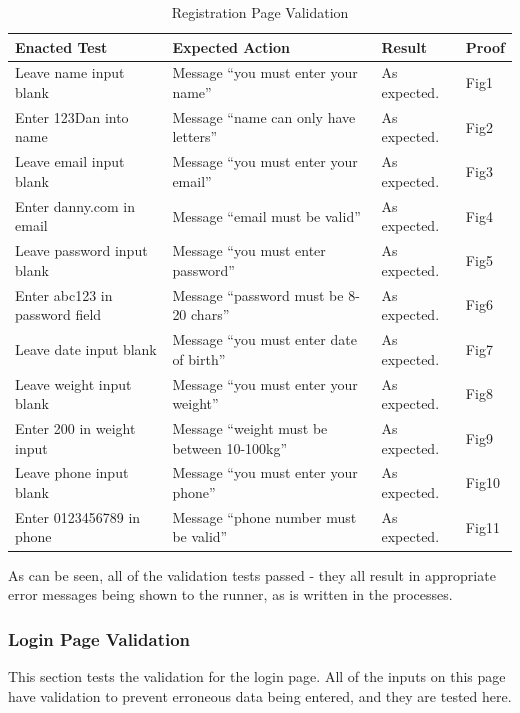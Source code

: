 \documentclass{article}[12pt,a4paper]
\begin{document}
\begin{table}[h]
\begin{tabular}{|l|l|l|l|}
\hline
\textbf{Enacted Test}          & \textbf{Expected Action}                  & \textbf{Result} & \textbf{Proof} \\ \hline
Leave name input blank         & Message ``you must enter your name''        & As expected.    & Fig1           \\ \hline
Enter 123Dan into name         & Message ``name can only have letters''      & As expected.    & Fig2           \\ \hline
Leave email input blank        & Message ``you must enter your email''       & As expected.    & Fig3           \\ \hline
Enter danny.com in email       & Message ``email must be valid''             & As expected.    & Fig4           \\ \hline
Leave password input blank     & Message ``you must enter password''         & As expected.    & Fig5           \\ \hline
Enter abc123 in password field & Message ``password must be 8-20 chars''     & As expected.    & Fig6           \\ \hline
Leave date input blank         & Message ``you must enter date of birth''    & As expected.    & Fig7           \\ \hline
Leave weight input blank       & Message ``you must enter your weight''      & As expected.    & Fig8           \\ \hline
Enter 200 in weight input      & Message ``weight must be between 10-100kg'' & As expected.    & Fig9           \\ \hline
Leave phone input blank        & Message ``you must enter your phone''       & As expected.    & Fig10          \\ \hline
Enter 0123456789 in phone      & Message ``phone number must be valid''      & As expected.    & Fig11          \\ \hline
\end{tabular}
\caption{Registration Page Validation}
\end{table}

As can be seen, all of the validation tests passed - they all result in appropriate error messages being shown to the runner, as is written in the processes.

\clearpage

\subsubsection{Login Page Validation}
This section tests the validation for the login page. All of the inputs on this page have validation to prevent erroneous data being entered, and they are tested here.
\end{document}
